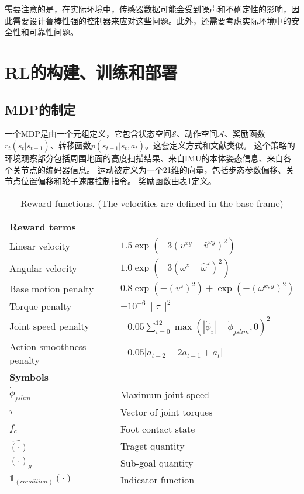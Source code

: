 需要注意的是，在实际环境中，传感器数据可能会受到噪声和不确定性的影响，因此需要设计鲁棒性强的控制器来应对这些问题。此外，还需要考虑实际环境中的安全性和可靠性问题。


\section{RL的构建、训练和部署}
\subsection{MDP的制定}

一个MDP是由一个元组定义，它包含状态空间$\mathcal{S}$、动作空间$\mathcal{A}$、奖励函数$r_t(s_t|s_{t+1})$、转移函数$p(s_{t+1}|s_t, a_t)$。这套定义方式和文献类似\cite[p]{Miki_Lee_Hwangbo_Wellhausen_Koltun_Hutter_2022}。
这个策略的环境观察部分包括周围地面的高度扫描结果、来自IMU的本体姿态信息、来自各个关节点的编码器信息。
运动被定义为一个21维的向量，包括步态参数偏移、关节点位置偏移和轮子速度控制指令。
奖励函数由表\ref{tb:reward_functions}定义。
\begin{table}[h!]
    \begin{center}
      \caption{Reward functions. (The velocities are defined in the base frame)}
      \label{tb:reward_functions}
      \begin{tabular}{l|l} %
        \hline
        \multicolumn{2}{l}{\textbf{Reward terms}}\\
        \hline
        Linear velocity & $1.5 \exp(-3(v^{xy}-\hat v^{xy})^2)$\\
        Angular velocity & $1.0\exp(-3(\omega^z-\hat\omega^z)^2)$\\
        Base motion penalty & $0.8\exp(-(v^z)^2)+\exp(-(\omega^{x,y})^2)$\\
        Torque penalty & $-10^{-6} \|\tau\|^2$\\
        Joint speed penalty & $-0.05\sum_{i=0}^{12}\max(|\dot \phi_i|-\dot\phi_{jslim},0)^2$\\
        Action smoothness penalty & $-0.05|a_{t-2}-2a_{t-1}+a_t|$\\
        \hline
        \multicolumn{2}{l}{\textbf{Symbols}}\\
        \hline
        $\dot \phi_{jslim}$ & Maximum joint speed\\
        $\tau$ & Vector of joint torques\\
        $f_c$ & Foot contact state\\
        $\hat{(\cdot)}$ & Traget quantity\\
        $(\cdot)_g$ & Sub-goal quantity\\
        $\mathbb{1}_{(condition)}(\cdot)$ & Indicator function\\
        \hline
      \end{tabular}
    \end{center}
\end{table}

